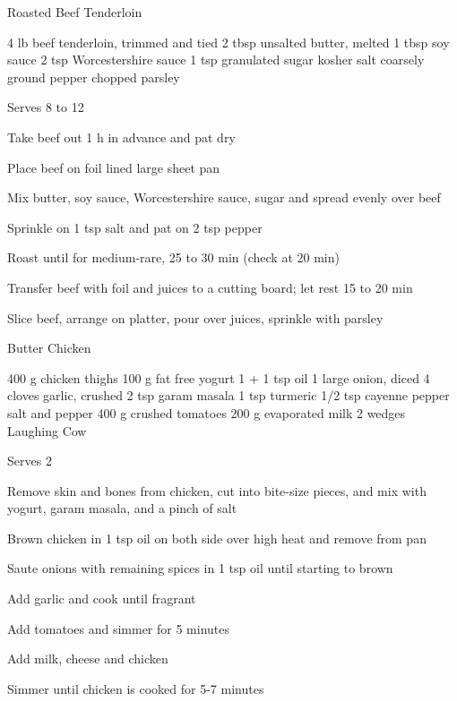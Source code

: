 \begin{denserecipe}{Roasted Beef Tenderloin}{}
\begin{ingredients}
4 lb beef tenderloin, \ibreak trimmed and tied
2 tbsp unsalted butter, melted
1 tbsp soy sauce
2 tsp Worcestershire sauce
1 tsp granulated sugar
kosher salt
coarsely ground pepper
chopped parsley
\end{ingredients}
\nextcolumn
Serves 8 to 12
\begin{steps}
\item Take beef out 1 h in advance and pat dry
\item Place beef on foil lined large sheet pan
\item Mix butter, soy sauce, Worcestershire sauce, sugar and spread evenly over beef
\item Sprinkle on 1 tsp salt and pat on 2 tsp pepper
\item Roast until  for medium-rare, 25 to 30 min (check at 20 min)
\item Transfer beef with foil and juices to a cutting board; let rest 15 to 20 min
\item Slice beef, arrange on platter, pour over juices, sprinkle with parsley
\end{steps}
\end{denserecipe}

\begin{denserecipe}{Butter Chicken}{}
\begin{ingredients}
400 g chicken thighs
100 g fat free yogurt
1 + 1 tsp oil
1 large onion, diced
4 cloves garlic, crushed
2 tsp garam masala
1 tsp turmeric
1/2 tsp cayenne pepper
salt and pepper
400 g crushed tomatoes
200 g evaporated milk
2 wedges Laughing Cow
\end{ingredients}
\nextcolumn
Serves 2
\begin{steps}
\item Remove skin and bones from chicken, cut into bite-size pieces, and mix with yogurt, garam masala, and a pinch of salt
\item Brown chicken in 1 tsp oil on both side over high heat and remove from pan
\item Saute onions with remaining spices in 1 tsp oil until starting to brown
\item Add garlic and cook until fragrant
\item Add tomatoes and simmer for 5 minutes
\item Add milk, cheese and chicken
\item Simmer until chicken is cooked for 5-7 minutes
\end{steps}
\end{denserecipe}


